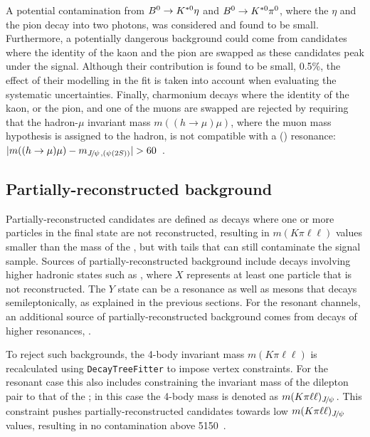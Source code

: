 A potential contamination from $\Bz \to\Kstarz\eta$ and $\Bz \to\Kstarz\pi^0$, where the $\eta$ and the pion decay into
two photons, was considered and found to be small.
Furthermore, a potentially dangerous background could come from candidates where the
identity of the kaon and the pion are swapped as these candidates peak under the signal.
Although their contribution is found to be small, 0.5\%, the effect of their modelling in the fit
is taken into account when evaluating the systematic uncertainties. Finally, charmonium decays where 
the identity of the kaon, or the pion, and one of the muons  are swapped are rejected by requiring that the 
hadron-$\mu$ invariant mass \mbox{$m((h \to \mu)\mu)$}, where the muon mass hypothesis is assigned to the hadron, 
is not compatible with a \jpsi (\psitwos) resonance: $|m((h\to \mu)\mu)-m_{\jpsi, (\psitwos)} | > 60$~\mevcc.

\subsection{Partially-reconstructed background}
\label{sec:RKst_peaking_Dchains}

Partially-reconstructed candidates are defined as decays where one or more particles in the final state are not reconstructed,
resulting in $m(K\pi\ell\ell)$ values smaller than the mass of the \Bz, but with tails that can still contaminate the signal sample.
Sources of partially-reconstructed background include decays involving higher hadronic states such as 
, where $X$ represents at least one particle that is not reconstructed. 
The $Y$ state can be a \Kstar resonance as well as \D mesons that decays semileptonically, as explained in the previous sections.
For the resonant channels, an additional source of partially-reconstructed 
background comes from decays of higher \ccbar resonances, .

To reject such backgrounds, the 4-body invariant mass $m(K\pi\ell\ell)$ is recalculated using 
\verb!DecayTreeFitter! to impose vertex constraints. For the resonant case this also includes constraining the invariant 
mass of the dilepton pair to that of the \jpsi; in this case the 4-body mass is denoted as $m(K\pi\ell\ell)_{\jpsi}$. This constraint 
pushes partially-reconstructed candidates towards low $m(K\pi\ell\ell)_{\jpsi}$ values, resulting in no contamination above 5150~\mevcc. 

